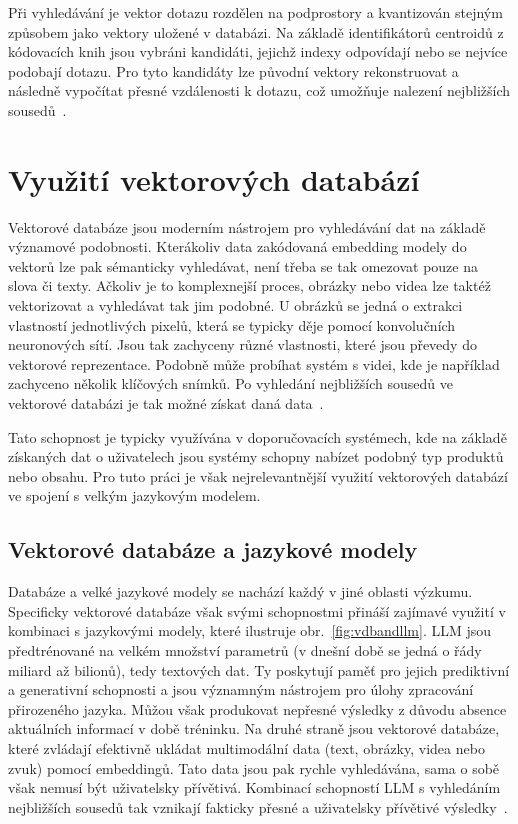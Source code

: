 Při vyhledávání je vektor dotazu rozdělen na podprostory a kvantizován stejným způsobem jako vektory uložené v databázi. Na základě identifikátorů centroidů z kódovacích knih jsou vybráni kandidáti, jejichž indexy odpovídají nebo se nejvíce podobají dotazu. Pro tyto kandidáty lze původní vektory rekonstruovat a následně vypočítat přesné vzdálenosti k dotazu, což umožňuje nalezení nejbližších sousedů~\cite{pq}.

\section{Využití vektorových databází}
Vektorové databáze jsou moderním nástrojem pro vyhledávání dat na základě významové podobnosti. Kterákoliv data zakódovaná embedding modely do vektorů lze pak sémanticky vyhledávat, není třeba se tak omezovat pouze na slova či texty. Ačkoliv je to komplexnejší proces, obrázky nebo videa lze taktéž vektorizovat a vyhledávat tak jim podobné. U obrázků se jedná o extrakci vlastností jednotlivých pixelů, která se typicky děje pomocí konvolučních neuronových sítí. Jsou tak zachyceny různé vlastnosti, které jsou převedy do vektorové reprezentace. Podobně může probíhat systém s videi, kde je například zachyceno několik klíčových snímků. Po vyhledání nejbližších sousedů ve vektorové databázi je tak možné získat daná data~\cite{vdbms}.

Tato schopnost je typicky využívána v doporučovacích systémech, kde na základě získaných dat o uživatelech jsou systémy schopny nabízet podobný typ produktů nebo obsahu. Pro tuto práci je však nejrelevantnější využití vektorových databází ve spojení s velkým jazykovým modelem. 

\subsection{Vektorové databáze a jazykové modely}
Databáze a velké jazykové modely se nachází každý v jiné oblasti výzkumu. Specificky vektorové databáze však svými schopnostmi přináší zajímavé využití v kombinaci s jazykovými modely, které ilustruje obr.~\ref{fig:vdbandllm}. LLM jsou předtrénované na velkém množství parametrů (v dnešní době se jedná o řády miliard až bilionů), tedy textových dat. Ty poskytují paměť pro jejich prediktivní a generativní schopnosti a jsou významným nástrojem pro úlohy zpracování přirozeného jazyka. Můžou však produkovat nepřesné výsledky z důvodu absence aktuálních informací v době tréninku. Na druhé straně jsou vektorové databáze, které zvládají efektivně ukládat multimodální data (text, obrázky, videa nebo zvuk) pomocí embeddingů. Tato data jsou pak rychle vyhledávána, sama o sobě však nemusí být uživatelsky přívětivá. Kombinací schopností LLM s vyhledáním nejbližších sousedů tak vznikají fakticky přesné a uživatelsky přívětivé výsledky~\cite{survey_vdb}.

